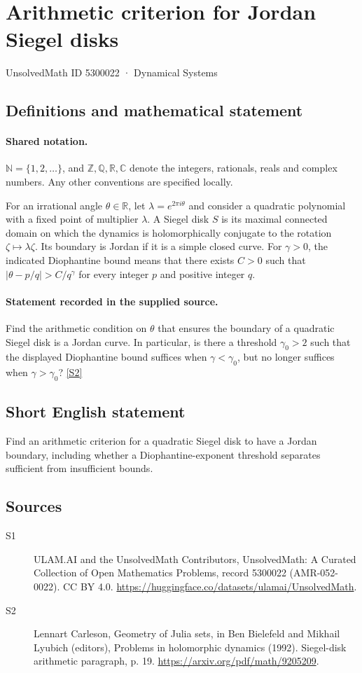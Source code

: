 \documentclass[11pt]{article}
\newcommand{\sref}[2]{\hyperlink{source:#1:#2}{[S#2]}}
\begin{document}
\setcounter{section}{5300021}
\section{Arithmetic criterion for Jordan Siegel disks}\label{5300022}
{\small\sffamily UnsolvedMath ID 5300022 · Dynamical Systems}
\subsection{Definitions and mathematical statement}

\paragraph{Shared notation.}$\mathbb N=\{1,2,\ldots\}$, and $\mathbb Z,\mathbb Q,\mathbb R,\mathbb C$ denote the integers, rationals, reals and complex numbers. Any other conventions are specified locally.


For an irrational angle $\theta\in\mathbb R$, let $\lambda=e^{2\pi i\theta}$ and consider a quadratic polynomial with a fixed point of multiplier $\lambda$. A Siegel disk $S$ is its maximal connected domain on which the dynamics is holomorphically conjugate to the rotation $\zeta\mapsto\lambda\zeta$. Its boundary is Jordan if it is a simple closed curve. For $\gamma>0$, the indicated Diophantine bound means that there exists $C>0$ such that $|\theta-p/q|>C/q^\gamma$ for every integer $p$ and positive integer $q$.
\paragraph{Statement recorded in the supplied source.}
Find the arithmetic condition on $\theta$ that ensures the boundary of a quadratic Siegel disk is a Jordan curve. In particular, is there a threshold $\gamma_0>2$ such that the displayed Diophantine bound suffices when $\gamma<\gamma_0$, but no longer suffices when $\gamma>\gamma_0$? \sref{5300022}{2}
\subsection{Short English statement}
Find an arithmetic criterion for a quadratic Siegel disk to have a Jordan boundary, including whether a Diophantine-exponent threshold separates sufficient from insufficient bounds.
\subsection{Sources}
\begin{description}
\item[\hypertarget{source:5300022:1}{S1}] ULAM.AI and the UnsolvedMath Contributors, UnsolvedMath: A Curated Collection of Open Mathematics Problems, record 5300022 (AMR-052-0022). CC BY 4.0. \url{https://huggingface.co/datasets/ulamai/UnsolvedMath}.
\item[\hypertarget{source:5300022:2}{S2}] Lennart Carleson, Geometry of Julia sets, in Ben Bielefeld and Mikhail Lyubich (editors), Problems in holomorphic dynamics (1992). Siegel-disk arithmetic paragraph, p. 19. \url{https://arxiv.org/pdf/math/9205209}.
\end{description}
\label{end:5300022}
\end{document}
